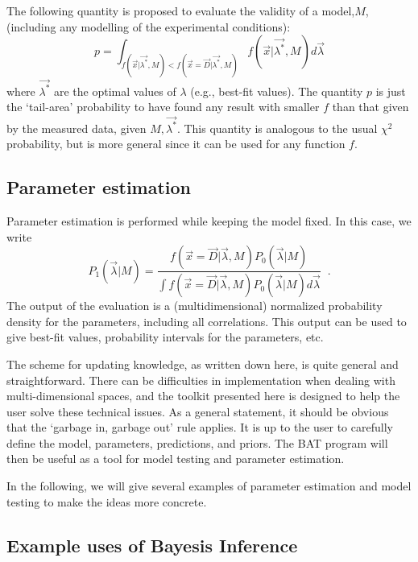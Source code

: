 \documentclass[11pt, a4paper]{article}
\begin{document}
The following quantity is proposed to evaluate the validity of a
model,$M$, (including any modelling of the experimental conditions):
%
\begin{equation}
p=\int_{f(\vec{x}|\vec{\lambda^*},M)<f(\vec{x}=\vec{D}|\vec{\lambda^*},M)} f(\vec{x}|\vec{\lambda^*},M) d\vec{\lambda}
\end{equation}
%
where $\vec{\lambda^*}$ are the optimal values of $\lambda$ (e.g.,
best-fit values). The quantity $p$ is just the `tail-area' probability
to have found any result with smaller $f$ than that given by the
measured data, given $M,\vec{\lambda^*}$.  This quantity is analogous
to the usual $\chi^2$ probability, but is more general since it can be
used for any function $f$.

\subsection{Parameter estimation}
%
Parameter estimation is performed while keeping the model fixed.  In
this case, we write
%
\begin{equation}
P_{1}(\vec{\lambda}|M) =\frac{f(\vec{x}=\vec{D}|\vec{\lambda},M) P_{0}(\vec{\lambda}|M)}
{\int f(\vec{x}=\vec{D}|\vec{\lambda},M) P_{0}(\vec{\lambda}|M) d\vec{\lambda}} \;\; .
\label{eqn:BayesTheorem}
\end{equation}
%
The output of the evaluation is a (multidimensional) normalized
probability density for the parameters, including all correlations.
This output can be used to give best-fit values, probability intervals
for the parameters, etc.

The scheme for updating knowledge, as written down here, is quite
general and straightforward.  There can be difficulties in
implementation when dealing with multi-dimensional spaces, and the
toolkit presented here is designed to help the user solve these
technical issues.  As a general statement, it should be obvious that
the `garbage in, garbage out' rule applies.  It is up to the user to
carefully define the model, parameters, predictions, and priors.  The
BAT program will then be useful as a tool for model testing and
parameter estimation.

In the following, we will give several examples of parameter
estimation and model testing to make the ideas more concrete.


\subsection{Example uses of Bayesis Inference} 
\label{subsection:exampleuses} 
\end{document}
